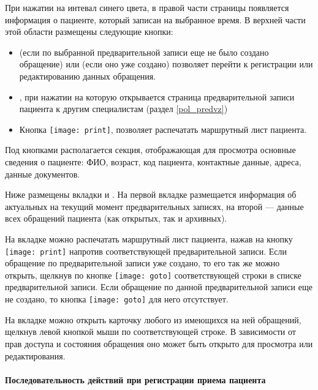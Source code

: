 {При нажатии на интевал синего цвета, в правой части страницы появляется информация о пациенте, который записан на выбранное время. В верхней части этой области размещены следующие кнопки:
\begin{itemize}
	\item {} (если по выбранной предварительной записи еще не было создано обращение) или  (если оно уже создано) позволяет перейти к регистрации или редактированию данных обращения.
	\item {}, при нажатии на которую открывается страница предварительной записи пациента к другим специалистам (раздел \ref{pol_predvz})
	\item Кнопка \texttt{[image: print]},  позволяет распечатать маршрутный лист пациента.
\end{itemize}
	
Под кнопками располагается секция, отображающая для просмотра основные сведения о пациенте: ФИО, возраст, код пациента, контактные данные, адреса, данные документов.

Ниже размещены вкладки  и . На первой вкладке размещается информация об актуальных на текущий момент предварительных записях, на второй --- данные всех обращений пациента (как открытых, так и архивных).

На вкладке  можно распечатать маршрутный лист пациента, нажав на кнопку \texttt{[image: print]} напротив соответствующей предварительной записи. Если обращение по предварительной записи уже создано, то его так же можно открыть, щелкнув по кнопке \texttt{[image: goto]} соответствующей строки в списке предварительной записи. Если обращение по данной предварительной записи еще не создано, то кнопка \texttt{[image: goto]} для него отсутствует. 

На вкладке  можно открыть карточку любого из имеющихся на ней обращений, щелкнув левой кнопкой мыши по соответствующей строке. В зависимости от прав доступа и состояния обращения оно может быть открыто для просмотра или редактирования.


\paragraph{Последовательность действий при регистрации приема пациента}

}
